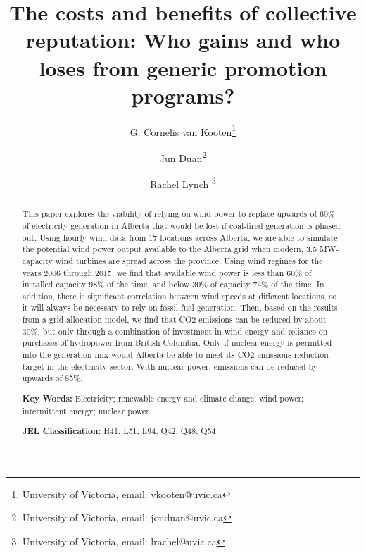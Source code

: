 \documentclass[a4paper,12pt]{article}
\begin{document}
\title{%
The costs and benefits of collective reputation: Who gains and who loses from generic promotion programs?
}

\author{
G. Cornelis van Kooten\thanks{%
University of Victoria, email: vkooten@uvic.ca} \\
  \and Jun Duan\thanks{%
University of Victoria, email: jonduan@uvic.ca} \\
  \and Rachel Lynch \thanks{%
University of Victoria, email: lrachel@uvic.ca} \\
} %


\maketitle

\begin{abstract}
This paper explores the viability of relying on wind power to replace upwards of 60\% of electricity generation in Alberta that would be lost if coal-fired generation is phased out. Using hourly wind data from 17 locations across Alberta, we are able to simulate the potential wind power output available to the Alberta grid when modern, 3.5 MW-capacity wind turbines are spread across the province. Using wind regimes for the years 2006 through 2015, we find that available wind power is less than 60\% of installed capacity 98\% of the time, and below 30\% of capacity 74\% of the time. In addition, there is significant correlation between wind speeds at different locations, so it will always be necessary to rely on fossil fuel generation. Then, based on the results from a grid allocation model, we find that CO2 emissions can be reduced by about 30\%, but only through a combination of investment in wind energy and reliance on purchases of hydropower from British Columbia. Only if nuclear energy is permitted into the generation mix would Alberta be able to meet its CO2-emissions reduction target in the electricity sector. With nuclear power, emissions can be reduced by upwards of 85\%. 

\textbf{Key Words:} Electricity; renewable energy and climate change; wind power; intermittent energy; nuclear power.

\textbf{JEL Classification: }H41, L51, L94, Q42, Q48, Q54 
\end{abstract}
\end{document}
